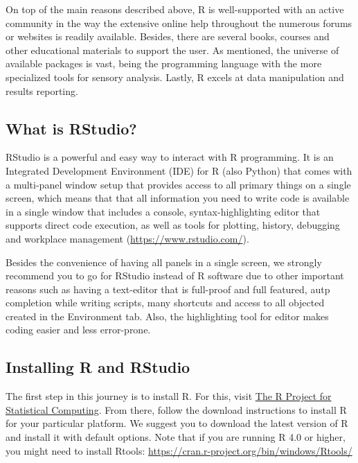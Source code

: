 \documentclass[
]{book}
\begin{document}
On top of the main reasons described above, R is well-supported with an active community in the way the extensive online help throughout the numerous forums or websites is readily available. Besides, there are several books, courses and other educational materials to support the user. As mentioned, the universe of available packages is vast, being the programming language with the more specialized tools for sensory analysis. Lastly, R excels at data manipulation and results reporting.

\hypertarget{what-is-rstudio}{%
\subsection{What is RStudio?}\label{what-is-rstudio}}

RStudio is a powerful and easy way to interact with R programming. It is an Integrated Development Environment (IDE) for R (also Python) that comes with a multi-panel window setup that provides access to all primary things on a single screen, which means that that all information you need to write code is available in a single window that includes a console, syntax-highlighting editor that supports direct code execution, as well as tools for plotting, history, debugging and workplace management (\url{https://www.rstudio.com/}).

Besides the convenience of having all panels in a single screen, we strongly recommend you to go for RStudio instead of R software due to other important reasons such as having a text-editor that is full-proof and full featured, autp completion while writing scripts, many shortcuts and access to all objected created in the Environment tab. Also, the highlighting tool for editor makes coding easier and less error-prone.

\hypertarget{installing-r-and-rstudio}{%
\subsection{Installing R and RStudio}\label{installing-r-and-rstudio}}

The first step in this journey is to install R. For this, visit \href{https://www.r-project.org/}{The R Project for Statistical Computing}. From there, follow the download instructions to install R for your particular platform. We suggest you to download the latest version of R and install it with default options. Note that if you are running R 4.0 or higher, you might need to install Rtools:
\url{https://cran.r-project.org/bin/windows/Rtools/}
\end{document}
